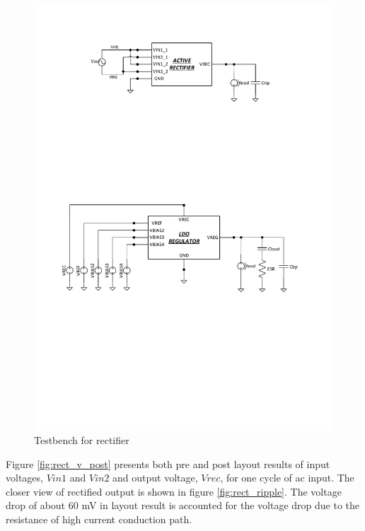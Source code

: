 \documentclass[12pt,a4paper,UKenglish]{report}
\begin{document}
\begin{figure}[!htbp] %
   \centering
   \includegraphics[width=\textwidth]{img/visio/visio_rect_tb.pdf} 
   \caption{Testbench for rectifier}
   \label{rect_tb}
\end{figure}

Figure  \ref{fig:rect_v_post}  presents both pre and post layout results of input voltages, $Vin1$ and $Vin2$  and output voltage, $Vrec$, for one cycle of ac input. The closer view of rectified output is shown in figure \ref{fig:rect_ripple}. The voltage drop of about 60 mV in layout result is accounted for the voltage drop due to 
the resistance of high current conduction path. \\
\end{document}
